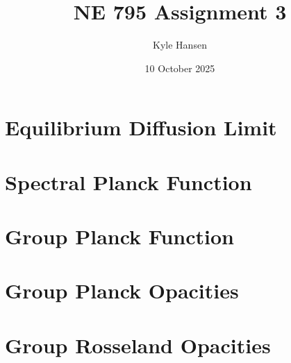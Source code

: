 \documentclass{template}
\title{NE 795 Assignment 3}
\author{Kyle Hansen}
\date{10 October 2025}
\begin{document}
\maketitle

\section{Equilibrium Diffusion Limit}

\section{Spectral Planck Function}

\section{Group Planck Function}

\section{Group Planck Opacities}

\section{Group Rosseland Opacities}
\end{document}
